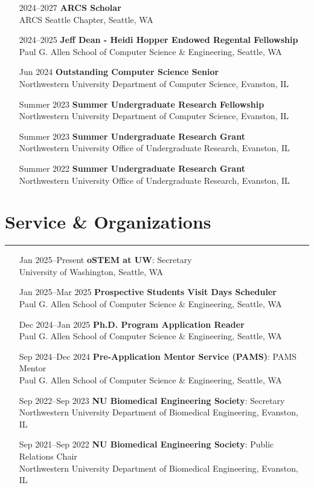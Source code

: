 \documentclass{article}
\begin{document}
\begin{itemize}[leftmargin=1.5in]
    \item[2024–2027] \textbf{ARCS Scholar}\\
    ARCS Seattle Chapter, Seattle, WA
    \item[2024–2025] \textbf{Jeff Dean - Heidi Hopper Endowed Regental Fellowship}\\
    Paul G. Allen School of Computer Science \& Engineering, Seattle, WA
    \item[Jun 2024] \textbf{Outstanding Computer Science Senior}\\
    Northwestern University Department of Computer Science, Evanston, IL
    \item[Summer 2023] \textbf{Summer Undergraduate Research Fellowship}\\
    Northwestern University Department of Computer Science, Evanston, IL
    \item[Summer 2023] \textbf{Summer Undergraduate Research Grant}\\
    Northwestern University Office of Undergraduate Research, Evanston, IL
    \item[Summer 2022] \textbf{Summer Undergraduate Research Grant}\\
    Northwestern University Office of Undergraduate Research, Evanston, IL
\end{itemize}

\section*{Service \& Organizations}
\hrule
\vspace{10pt}

\begin{itemize}[leftmargin=1.5in]
    \item[Jan 2025–Present] \textbf{oSTEM at UW}: Secretary\\
    University of Washington, Seattle, WA
    \item[Jan 2025–Mar 2025] \textbf{Prospective Students Visit Days Scheduler}\\
    Paul G. Allen School of Computer Science \& Engineering, Seattle, WA
    \item[Dec 2024–Jan 2025] \textbf{Ph.D. Program Application Reader}\\
    Paul G. Allen School of Computer Science \& Engineering, Seattle, WA
    \item[Sep 2024–Dec 2024] \textbf{Pre-Application Mentor Service (PAMS)}: PAMS Mentor\\
    Paul G. Allen School of Computer Science \& Engineering, Seattle, WA
    \item[Sep 2022–Sep 2023] \textbf{NU Biomedical Engineering Society}: Secretary\\
    Northwestern University Department of Biomedical Engineering, Evanston, IL
    \item[Sep 2021–Sep 2022] \textbf{NU Biomedical Engineering Society}: Public Relations Chair\\
    Northwestern University Department of Biomedical Engineering, Evanston, IL
\end{itemize}
\end{document}

